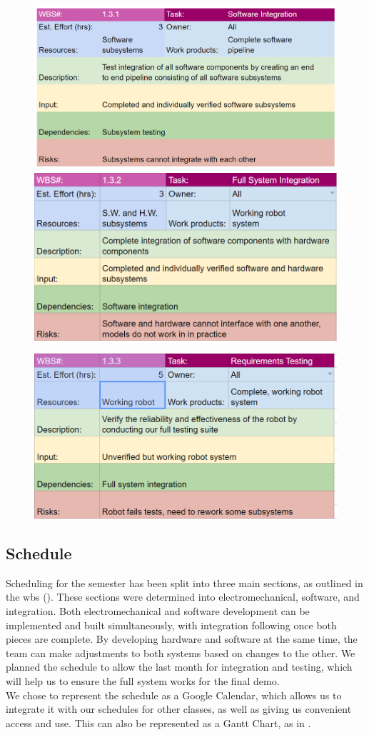 \begin{figure}[h!]
\centering
\includegraphics[width=0.49\columnwidth]{wbs_schedule/wbs_dict_int1.PNG}
\includegraphics[width=0.49\columnwidth]{wbs_schedule/wbs_dict_int2.PNG}
\label{fig:int1int2}
\end{figure}
\begin{figure}[h!]
\centering
\includegraphics[width=0.49\columnwidth]{wbs_schedule/wbs_dict_int3.PNG}
\label{fig:int3}
\end{figure}

\clearpage 

\subsection{Schedule}
\label{sec:schedule}
Scheduling for the semester has been split into three main sections, as outlined in the wbs (). These sections were determined into electromechanical, software, and integration. Both electromechanical and software development can be implemented and built simultaneously, with integration following once both pieces are complete. By developing hardware and software at the same time, the team can make adjustments to both systems based on changes to the other. We planned the schedule to allow the last month for integration and testing, which will help us to ensure the full system works for the final demo. \\
We chose to represent the schedule as a Google Calendar, which allows us to integrate it with our schedules for other classes, as well as giving us convenient access and use. This can also be represented as a Gantt Chart, as in .

